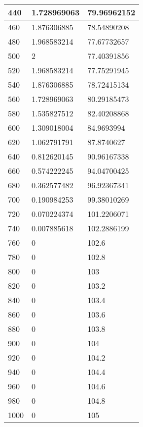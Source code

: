 \documentclass[12pt]{article}
\begin{document}
\begin{longtable}{|l|l|l|}
    440    & 1.728969063    & 79.96962152            \\ \hline
    460    & 1.876306885    & 78.54890208            \\ \hline
    480    & 1.968583214    & 77.67732657            \\ \hline
    500    & 2              & 77.40391856            \\ \hline
    520    & 1.968583214    & 77.75291945            \\ \hline
    540    & 1.876306885    & 78.72415134            \\ \hline
    560    & 1.728969063    & 80.29185473            \\ \hline
    580    & 1.535827512    & 82.40208868            \\ \hline
    600    & 1.309018004    & 84.9693994             \\ \hline
    620    & 1.062791791    & 87.8740627             \\ \hline
    640    & 0.812620145    & 90.96167338            \\ \hline
    660    & 0.574222245    & 94.04700425            \\ \hline
    680    & 0.362577482    & 96.92367341            \\ \hline
    700    & 0.190984253    & 99.38010269            \\ \hline
    720    & 0.070224374    & 101.2206071            \\ \hline
    740    & 0.007885618    & 102.2886199            \\ \hline
    760    & 0              & 102.6                  \\ \hline
    780    & 0              & 102.8                  \\ \hline
    800    & 0              & 103                    \\ \hline
    820    & 0              & 103.2                  \\ \hline
    840    & 0              & 103.4                  \\ \hline
    860    & 0              & 103.6                  \\ \hline
    880    & 0              & 103.8                  \\ \hline
    900    & 0              & 104                    \\ \hline
    920    & 0              & 104.2                  \\ \hline
    940    & 0              & 104.4                  \\ \hline
    960    & 0              & 104.6                  \\ \hline
    980    & 0              & 104.8                  \\ \hline
    1000   & 0              & 105                    \\ \hline
    \end{longtable}
\end{document}

